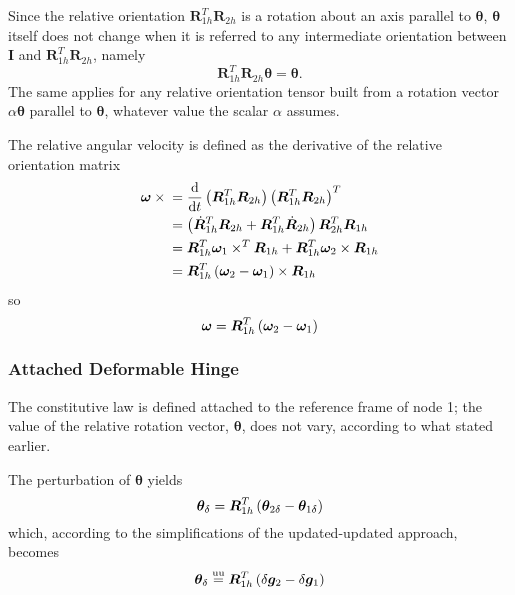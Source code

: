 \documentclass[10pt,dvips,fleqn,subeqn]{report}
\newcommand{\T}[1]{\bm{#1}}
\newcommand{\equu}{\overset{\text{uu}}{=}}
\begin{document}
Since the relative orientation $\T{R}_{1h}^T \T{R}_{2h}$ is a rotation 
about an axis parallel to $\T{\theta}$, $\T{\theta}$ itself
does not change when it is referred to any intermediate orientation
between $\T{I}$ and $\T{R}_{1h}^T \T{R}_{2h}$, namely
\begin{equation}
	\T{R}_{1h}^T \T{R}_{2h}\T{\theta} = \T{\theta} .
\end{equation}
The same applies for any relative orientation tensor built from a rotation
vector $\alpha\T{\theta}$ parallel to $\T{\theta}$, whatever value 
the scalar $\alpha$ assumes.

The relative angular velocity is defined as the derivative
of the relative orientation matrix
\begin{align}
	\T{\omega}\times{}
	&= \frac{\mathrm{d}}{\mathrm{d}t} \plbr{
		\T{R}_{1h}^T \T{R}_{2h}
	} \plbr{
		\T{R}_{1h}^T \T{R}_{2h}
	}^T \nonumber \\
	&= \plbr{
		\dot{\T{R}}_{1h}^T \T{R}_{2h}
		+ \T{R}_{1h}^T \dot{\T{R}}_{2h}
	} \T{R}_{2h}^T \T{R}_{1h} \nonumber \\
	&= \T{R}_{1h}^T \T{\omega}_1 \times^T \T{R}_{1h}
	+ \T{R}_{1h}^T \T{\omega}_2 \times \T{R}_{1h} \nonumber \\
	&= \T{R}_{1h}^T \plbr{
		\T{\omega}_2 - \T{\omega}_1
	}\times \T{R}_{1h}
\end{align}
so
\begin{equation}
	\T{\omega} = \T{R}_{1h}^T \plbr{
		\T{\omega}_2 - \T{\omega}_1
	}
	\label{eq:deformable-hinge-attached-omega}
\end{equation}



\subsubsection{Attached Deformable Hinge}
The constitutive law is defined attached to the reference frame of node 1;
the value of the relative rotation vector, $\T{\theta}$, does not vary,
according to what stated earlier.

The perturbation of $\T{\theta}$ yields
\begin{equation}
	\T{\theta}_{\delta} = \T{R}_{1h}^T\plbr{\T{\theta}_{2\delta} - \T{\theta}_{1\delta}}
	\label{eq:def-h-theta-delta}
\end{equation}
which, according to the simplifications of the updated-updated approach, becomes
\begin{equation}
	\T{\theta}_{\delta} \equu \T{R}_{1h}^T\plbr{\delta\T{g}_2 - \delta\T{g}_1}
\end{equation}
\end{document}
